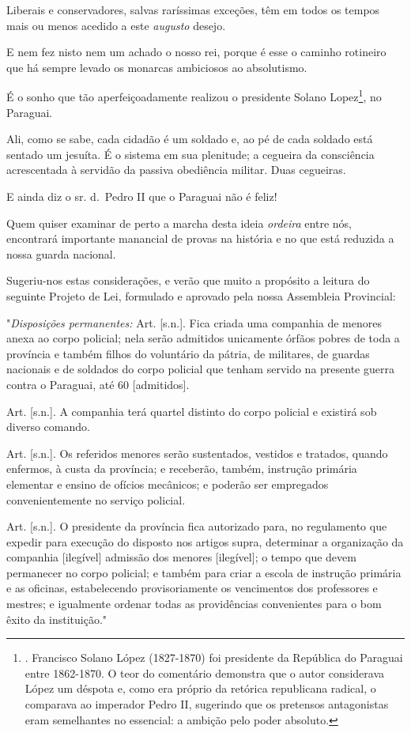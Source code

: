 Liberais e conservadores, salvas raríssimas exceções, têm em todos os
tempos mais ou menos acedido a este \emph{augusto} desejo.

E nem fez nisto nem um achado o nosso rei, porque é esse o caminho
rotineiro que há sempre levado os monarcas ambiciosos ao absolutismo.

É o sonho que tão aperfeiçoadamente realizou o presidente Solano
Lopez\footnote{. Francisco Solano López (1827-1870) foi presidente da
  República do Paraguai entre 1862-1870. O teor do comentário demonstra
  que o autor considerava López um déspota e, como era próprio da
  retórica republicana radical, o comparava ao imperador Pedro II,
  sugerindo que os pretensos antagonistas eram semelhantes no essencial:
  a ambição pelo poder absoluto.}, no Paraguai.

Ali, como se sabe, cada cidadão é um soldado e, ao pé de cada soldado
está sentado um jesuíta. É o sistema em sua plenitude; a cegueira da
consciência acrescentada à servidão da passiva obediência militar. Duas
cegueiras.

E ainda diz o sr. d.~Pedro II que o Paraguai não é feliz!

Quem quiser examinar de perto a marcha desta ideia \emph{ordeira} entre
nós, encontrará importante manancial de provas na história e no que está
reduzida a nossa guarda nacional.

Sugeriu-nos estas considerações, e verão que muito a propósito a leitura
do seguinte Projeto de Lei, formulado e aprovado pela nossa Assembleia
Provincial:

"\emph{Disposições permanentes:} Art. {[}s.n.{]}. Fica criada uma
companhia de menores anexa ao corpo policial; nela serão admitidos
unicamente órfãos pobres de toda a província e também filhos do
voluntário da pátria, de militares, de guardas nacionais e de soldados
do corpo policial que tenham servido na presente guerra contra o
Paraguai, até 60 {[}admitidos{]}.

Art. {[}s.n.{]}. A companhia terá quartel distinto do corpo policial e
existirá sob diverso comando.

Art. {[}s.n.{]}. Os referidos menores serão sustentados, vestidos e
tratados, quando enfermos, à custa da província; e receberão, também,
instrução primária elementar e ensino de ofícios mecânicos; e poderão
ser empregados convenientemente no serviço policial.

Art. {[}s.n.{]}. O presidente da província fica autorizado para, no
regulamento que expedir para execução do disposto nos artigos supra,
determinar a organização da companhia {[}ilegível{]} admissão dos
menores {[}ilegível{]}; o tempo que devem permanecer no corpo policial;
e também para criar a escola de instrução primária e as oficinas,
estabelecendo provisoriamente os vencimentos dos professores e mestres;
e igualmente ordenar todas as providências convenientes para o bom êxito
da instituição."

